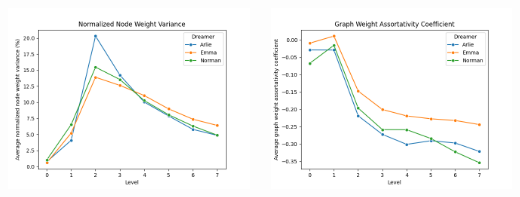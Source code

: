 \begin{minipage}[t]{\textwidth}
\begin{columns}
    \begin{column}{0.45\textwidth}
        \includegraphics[width=\textwidth]{immagini/normalized_node_weight_variance}
    \end{column}
    \begin{column}{0.45\textwidth}
        \includegraphics[width=\textwidth]{immagini/weight_assortativity_coefficient}
    \end{column}
    \end{columns}
\end{minipage}